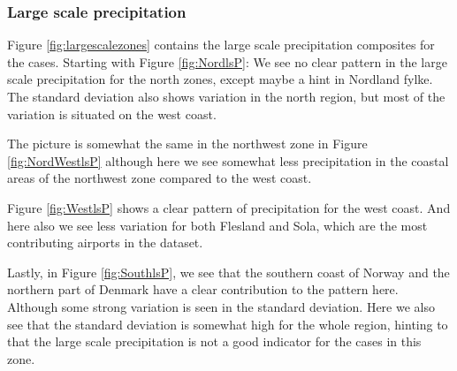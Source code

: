 \subsubsection{Large scale precipitation}
Figure \ref{fig:largescalezones} contains the large scale precipitation composites for the cases. Starting with Figure \ref{fig:NordlsP}: We see no clear pattern in the large scale precipitation for the north zones, except maybe a hint in Nordland fylke. The standard deviation also shows variation in the north region, but most of the variation is situated on the west coast. 

The picture is somewhat the same in the northwest zone in Figure \ref{fig:NordWestlsP} although here we see somewhat less precipitation in the coastal areas of the northwest zone compared to the west coast.

Figure \ref{fig:WestlsP} shows a clear pattern of precipitation for the west coast. And here also we see less variation for both Flesland and Sola, which are the most contributing airports in the dataset. 

Lastly, in Figure \ref{fig:SouthlsP}, we see that the southern coast of Norway and the northern part of Denmark have a clear contribution to the pattern here. Although some strong variation is seen in the standard deviation. Here we also see that the standard deviation is somewhat high for the whole region, hinting to that the large scale precipitation is not a good indicator for the cases in this zone.

